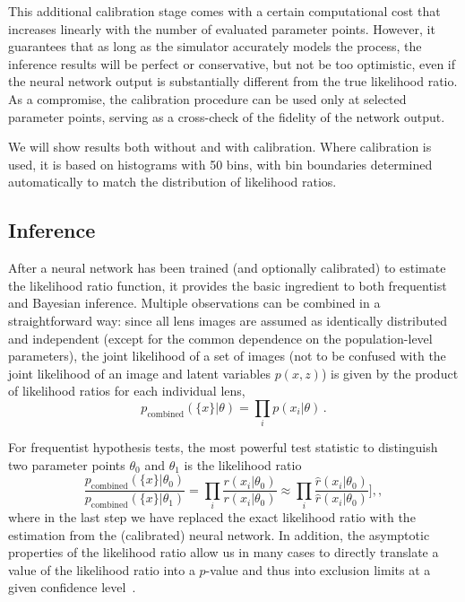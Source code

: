 \documentclass[twocolumn]{aastex62}
\begin{document}
This additional calibration stage comes with a certain computational cost that increases linearly with the number of evaluated parameter points. However, it guarantees that as long as the simulator accurately models the process, the inference results will be perfect or conservative, but not be too optimistic, even if the neural network output is substantially different from the true likelihood ratio. As a compromise, the calibration procedure can be used only at selected parameter points, serving as a cross-check of the fidelity of the network output.

We will show results both without and with calibration. Where calibration is used, it is based on histograms with 50 bins, with bin boundaries determined automatically to match the distribution of likelihood ratios.


\subsection{Inference}
\label{sec:lfi-inference}

After a neural network has been trained (and optionally calibrated) to estimate the likelihood ratio function, it provides the basic ingredient to both frequentist and Bayesian inference. Multiple observations can be combined in a straightforward way: since all lens images are assumed as identically distributed and independent (except for the common dependence on the population-level parameters), the joint likelihood of a set of images (not to be confused with the joint likelihood of an image and latent variables $p(x,z)$) is given by the product of likelihood ratios for each individual lens,
%
\begin{equation}
  p_\mathrm{combined}(\{x\}|\theta) = \prod_{i} p(x_i | \theta) \,.
\end{equation}

For frequentist hypothesis tests, the most powerful test statistic to distinguish two parameter points $\theta_0$ and $\theta_1$ is the likelihood ratio~\citep{1933RSPTA.231..289N}
%
\begin{equation}
    \frac{p_\mathrm{combined}(\{x\}|\theta_0)}{p_\mathrm{combined}(\{x\}|\theta_1)} = \prod_{i} \frac{r(x_i | \theta_0)}{r(x_i | \theta_0)} \approx \prod_{i} \frac{\hat{r}(x_i | \theta_0)}{\hat{r}(x_i | \theta_0)} ],,
\end{equation}
%
where in the last step we have replaced the exact likelihood ratio with the estimation from the (calibrated) neural network. In addition, the asymptotic properties of the likelihood ratio allow us in many cases to directly translate a value of the likelihood ratio into a $p$-value and thus into exclusion limits at a given confidence level~\citep{Wilks:1938dza, Wald, Cowan:2010js}.
\end{document}
